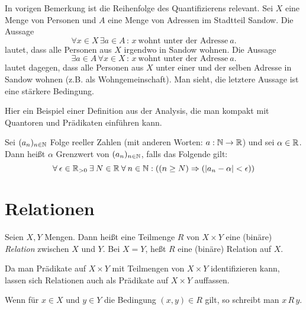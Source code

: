 \begin{bem}
	In vorigen Bemerkung ist die Reihenfolge des Quantifizierens relevant. Sei $X$ eine Menge von  Personen und $A$ eine Menge von Adressen im Stadtteil Sandow. Die Aussage 
	\[
		\forall x \in X \, \exists a \in A \, :\, x \ \text{wohnt unter der Adresse} \  a .
	\]
	lautet, dass alle Personen aus $X$ irgendwo in Sandow wohnen. Die Aussage 
	\[
		\exists a \in A \, \forall x \in X \,:\, x \ \text{wohnt unter der Adresse} \ a.
	\]
	lautet dagegen, dass alle Personen aus $X$ unter einer und der selben Adresse in Sandow wohnen (z.B. als Wohngemeinschaft). Man sieht, die letztere Aussage ist eine stärkere Bedingung. 
\end{bem} 

\begin{bsp}
	Hier ein Beispiel einer Definition aus der Analysis, die man kompakt mit Quantoren und Prädikaten einführen kann. 
	
	Sei $ (a_n)_{n \in \mathbb{N}} $ Folge reeller Zahlen (mit anderen Worten: $ a : \mathbb{N} \to \mathbb{R} $) und sei $ \alpha \in \mathbb{R} $. Dann heißt $ \alpha $ Grenzwert von $ (a_n)_{n \in \mathbb{N}} $, falls das Folgende gilt:
	\begin{equation*}
		\forall\: \epsilon \in \mathbb{R}_{>0} \:\exists\: N \in \mathbb{R} \:\forall\: n \in \mathbb{N}: \left( (n \geq N) \Rightarrow (|a_n - \alpha| < \epsilon) \right)
	\end{equation*}
\end{bsp} 

\section{Relationen}


\begin{defn}
Seien $ X,Y $ Mengen. Dann heißt eine Teilmenge $ R $ von $ X \times Y $ eine (binäre) \emph{Relation} zwischen $ X $ und $ Y $. Bei $X = Y$, heßt $R$ eine (binäre) Relation auf $X$. 
\end{defn}

\begin{bem}
	Da man Prädikate auf $X \times Y$ mit Teilmengen von $X \times Y$ identifizieren kann, lassen sich Relationen auch als Prädikate auf $X \times Y$ auffassen. 
\end{bem} 

\begin{bem}
Wenn für $ x \in X $ und $ y \in Y $ die Bedingung $ (x,y) \in R $ gilt, so schreibt man $ x \, R \, y $. 
\end{bem}

